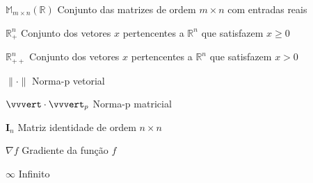 \documentclass[
	oldfontcommands,
	sumario=abnt-6027-2012,
	12pt,			%
	openright,		%
	oneside,		%
	a4paper,		%
	english,		%
	brazil			%
	]{imecc-unicamp}
\begin{document}
\begin{simbolos}
  \item[$ \mathds{M}_{m\times n}(\mathds{R}) $] Conjunto das matrizes de ordem $m\times n$ com entradas reais
  \item[$ \mathds{R}^n_+ $] Conjunto dos vetores $x$ pertencentes a $\mathds{R}^n$ que satisfazem $x\geq0$
  \item[$ \mathds{R}^n_{++} $] Conjunto dos vetores $x$ pertencentes a $\mathds{R}^n$ que satisfazem $x>0$
  \item[$\|\cdot\|$] Norma-p vetorial
  \item[$\vvvert\cdot\vvvert_p$] Norma-p matricial
  \item[$\mathbf{I}_n$] Matriz identidade de ordem $n \times n$
  \item[$\nabla f$] Gradiente da função $f$
  \item[$\infty$] Infinito
\end{simbolos}
\listofalgorithms
\cleardoublepage
\begin{KeepFromToc}
\lstlistoflistings
\end{KeepFromToc}
\cleardoublepage
\tableofcontents*
\cleardoublepage
\textual

\end{document}
